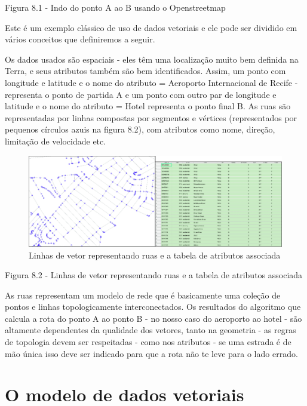 \documentclass[
]{krantz}
\begin{document}
Figura 8.1 - Indo do ponto A ao B usando o Openstreetmap

Este é um exemplo clássico de uso de dados vetoriais e ele pode ser dividido em vários conceitos que definiremos a seguir.

Os dados usados \hspace{0pt}\hspace{0pt}são espaciais - eles têm uma localização muito bem definida na Terra, e seus atributos também são bem identificados. Assim, um ponto com longitude e latitude e o nome do atributo = Aeroporto Internacional de Recife - representa o ponto de partida A e um ponto com outro par de longitude e latitude e o nome do atributo = Hotel representa o ponto final B. As ruas são representadas por linhas compostas por segmentos e vértices (representados por pequenos círculos azuis na figura 8.2), com atributos como nome, direção, limitação de velocidade etc.

\begin{figure}
\centering
\includegraphics{media/modulo8/fig82.png}
\caption{Linhas de vetor representando ruas e a tabela de atributos associada}
\end{figure}

Figura 8.2 - Linhas de vetor representando ruas e a tabela de atributos associada

As ruas representam um modelo de rede que é basicamente uma coleção de pontos e linhas topologicamente interconectados. Os resultados do algoritmo que calcula a rota do ponto A ao ponto B - no nosso caso do aeroporto ao hotel - são altamente dependentes da qualidade dos vetores, tanto na geometria - as regras de topologia devem ser respeitadas - como nos atributos - se uma estrada é de mão única isso deve ser indicado para que a rota não te leve para o lado errado.

\hypertarget{o-modelo-de-dados-vetoriais}{%
\section{O modelo de dados vetoriais}\label{o-modelo-de-dados-vetoriais}}
\end{document}
